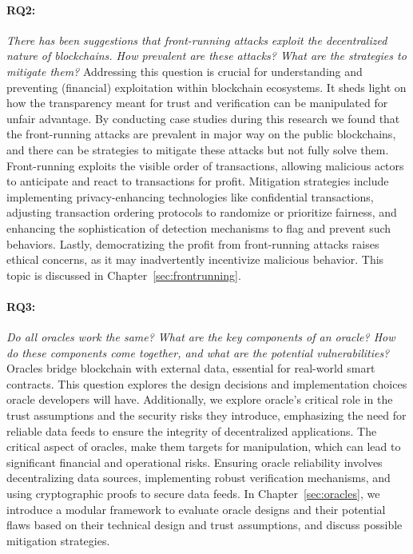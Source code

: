 \paragraph{RQ2:} \textit{There has been suggestions that front-running attacks exploit the decentralized nature of blockchains. How prevalent are these attacks? What are the strategies to mitigate them?}
Addressing this question is crucial for understanding and preventing (financial) exploitation within blockchain ecosystems. It sheds light on how the transparency meant for trust and verification can be manipulated for unfair advantage. By conducting case studies during this research we found that the front-running attacks are prevalent in major way on the public blockchains, and there can be strategies to mitigate these attacks but not fully solve them. Front-running exploits the visible order of transactions, allowing malicious actors to anticipate and react to transactions for profit. Mitigation strategies include implementing privacy-enhancing technologies like confidential transactions, adjusting transaction ordering protocols to randomize or prioritize fairness, and enhancing the sophistication of detection mechanisms to flag and prevent such behaviors. Lastly, democratizing the profit from front-running attacks raises ethical concerns, as it may inadvertently incentivize malicious behavior. This topic is discussed in Chapter~\ref{sec:frontrunning}.

\paragraph{RQ3:} \textit{Do all oracles work the same? What are the key components of an oracle? How do these components come together, and what are the potential vulnerabilities?}
Oracles bridge blockchain with external data, essential for real-world smart contracts. This question explores the design decisions and implementation choices oracle developers will have. Additionally, we explore oracle's critical role in the trust assumptions and the security risks they introduce, emphasizing the need for reliable data feeds to ensure the integrity of decentralized applications. The critical aspect of oracles, make them targets for manipulation, which can lead to significant financial and operational risks. Ensuring oracle reliability involves decentralizing data sources, implementing robust verification mechanisms, and using cryptographic proofs to secure data feeds. In Chapter~\ref{sec:oracles}, we introduce a modular framework to evaluate oracle designs and their potential flaws based on their technical design and trust assumptions, and discuss possible mitigation strategies.

